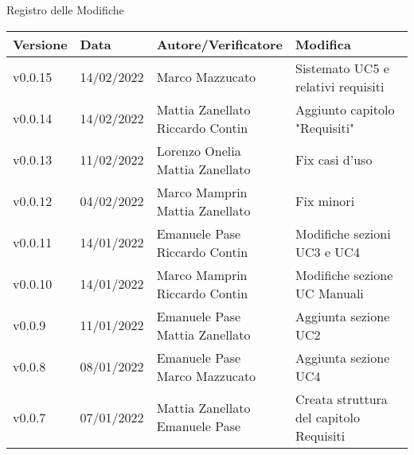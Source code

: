 \begin{center}
  \huge{Registro delle Modifiche}
\end{center}
\newcommand{\aCapo}[1]{%
  \begin{tabular}{@{}c@{}}\strut#1\strut\end{tabular}%
}
\begin{center}
  \begin{longtable}{|p{2cm}|p{2cm}|p{4cm}|p{5cm}|}
    \hline
    \textbf{Versione} & \textbf{Data} & \textbf{Autore/Verificatore}               & \textbf{Modifica}                               \\ \hline
    v0.0.15           & 14/02/2022    & \aCapo{Marco Mazzucato\\}  & Sistemato UC5 e relativi requisiti          \\ \hline
    v0.0.14           & 14/02/2022    & \aCapo{Mattia Zanellato\\Riccardo Contin}  & Aggiunto capitolo "Requisiti"                   \\ \hline
    v0.0.13           & 11/02/2022    & \aCapo{Lorenzo Onelia\\Mattia Zanellato}   & Fix casi d'uso                                  \\ \hline
    v0.0.12           & 04/02/2022    & \aCapo{Marco Mamprin\\Mattia Zanellato}    & Fix minori                                      \\ \hline
    v0.0.11           & 14/01/2022    & \aCapo{Emanuele Pase\\Riccardo Contin}     & Modifiche sezioni UC3 e UC4                     \\ \hline
    v0.0.10           & 14/01/2022    & \aCapo{Marco Mamprin\\Riccardo Contin}     & Modifiche sezione UC Manuali                    \\ \hline
    v0.0.9            & 11/01/2022    & \aCapo{Emanuele Pase\\Mattia Zanellato}    & Aggiunta sezione UC2                            \\ \hline
    v0.0.8            & 08/01/2022    & \aCapo{Emanuele Pase\\Marco Mazzucato}     & Aggiunta sezione UC4                            \\ \hline
    v0.0.7            & 07/01/2022    & \aCapo{Mattia Zanellato\\Emanuele Pase}    & Creata struttura del capitolo Requisiti         \\ \hline

\end{longtable}
\end{center}
